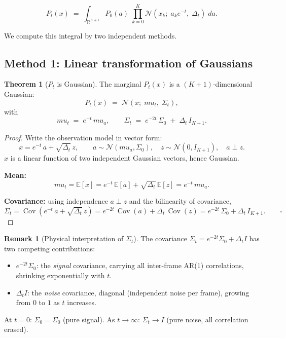 \documentclass[12pt, a4paper]{article}
\def\ba{a}%
\def\bx{x}%
\def\bmu{mu}%
\def\bm#1{#1}%
\theoremstyle{definition}
\newtheorem{theorem}{Theorem}[section]
\newtheorem{remark}{Remark}[section]
\newcommand{\R}{\mathbb{R}}
\newcommand{\E}{\mathbb{E}}
\newcommand{\Cov}{\operatorname{Cov}}
\newcommand{\N}{\mathcal{N}}
\newcommand{\ba}{\bm{a}}
\newcommand{\bx}{\bm{x}}
\newcommand{\bmu}{\bm{\mu}}
\newcommand{\bz}{\bm{z}}
\newcommand{\dt}{\Delta_t}
\begin{document}
\begin{resultbox}
\[
  P_t(\bx)
  \;=\;
  \int_{\R^{K+1}} P_0(\ba)\;\prod_{k=0}^{K}
  \N\!\left(x_k;\; a_k e^{-t},\; \dt\right)
  \;d\ba.
  \tag{Mézard's board formula}
\]
\end{resultbox}

We compute this integral by two independent methods.

\subsection{Method 1: Linear transformation of Gaussians}

\begin{theorem}[$P_t$ is Gaussian]\label{thm:Pt_linear}
The marginal $P_t(\bx)$ is a $(K+1)$-dimensional Gaussian:
\[
  P_t(\bx) \;=\; \N\!\left(\bx;\; \bmu_t,\; \Sigma_t\right),
\]
with
\[
  \bmu_t \;=\; e^{-t}\,\bmu_a,
  \qquad
  \Sigma_t \;=\; e^{-2t}\,\Sigma_0 \;+\; \dt\, I_{K+1}.
\]
\end{theorem}

\begin{proof}
Write the observation model in vector form:
\[
  \bx = e^{-t}\,\ba + \sqrt{\dt}\,\bz,
  \qquad
  \ba \sim \N(\bmu_a, \Sigma_0),
  \quad
  \bz \sim \N(\bm{0}, I_{K+1}),
  \quad
  \ba \perp \bz.
\]
$\bx$ is a linear function of two independent Gaussian vectors,
hence Gaussian.

\textbf{Mean:}
\[
  \bmu_t
  = \E[\bx]
  = e^{-t}\,\E[\ba] + \sqrt{\dt}\,\E[\bz]
  = e^{-t}\,\bmu_a.
\]

\textbf{Covariance:} using independence $\ba \perp \bz$ and the
bilinearity of covariance,
\[
  \Sigma_t
  = \Cov\!\left(e^{-t}\,\ba + \sqrt{\dt}\,\bz\right)
  = e^{-2t}\,\Cov(\ba) + \dt\,\Cov(\bz)
  = e^{-2t}\,\Sigma_0 + \dt\,I_{K+1}. \qquad\square
\]
\end{proof}

\begin{remark}[Physical interpretation of $\Sigma_t$]
The covariance $\Sigma_t = e^{-2t}\Sigma_0 + \dt I$ has two competing
contributions:
\begin{itemize}
  \item $e^{-2t}\Sigma_0$: the \emph{signal} covariance, carrying all
    inter-frame AR(1) correlations, shrinking exponentially with $t$.
  \item $\dt I$: the \emph{noise} covariance, diagonal (independent
    noise per frame), growing from $0$ to $1$ as $t$ increases.
\end{itemize}
At $t=0$: $\Sigma_0 = \Sigma_0$ (pure signal). As $t\to\infty$:
$\Sigma_t \to I$ (pure noise, all correlation erased).
\end{remark}
\end{document}
